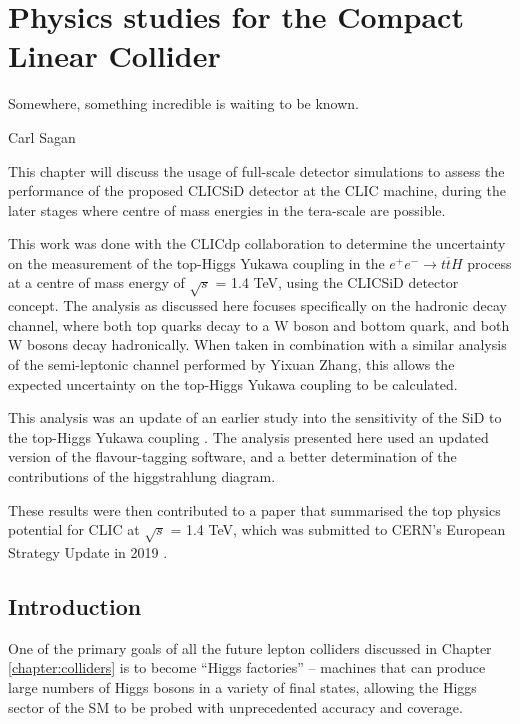 
\chapter{Physics studies for the Compact Linear Collider}
\label{chapter:analysis}

\epigraph{Somewhere, something incredible is waiting to be known.}{Carl Sagan}

This chapter will discuss the usage of full-scale detector simulations to assess the performance of the proposed \acrshort{CLIC}\textunderscore \acrshort{SiD} detector at the \acrlong{CLIC} machine, during the later stages where centre of mass energies in the tera-scale are possible.

This work was done with the \acrfull{CLICdp} collaboration to determine the uncertainty on the measurement of the top-Higgs Yukawa coupling in the $e^+ e^- \rightarrow t\overline{t}H$ process at a centre of mass energy of $\sqrt{s}$ = 1.4 TeV, using the \acrshort{CLIC}\textunderscore \acrshort{SiD} detector concept. The analysis as discussed here focuses specifically on the hadronic decay channel, where both top quarks decay to a W boson and bottom quark, and both W bosons decay hadronically. When taken in combination with a similar analysis of the semi-leptonic channel performed by Yixuan Zhang, this allows the expected uncertainty on the top-Higgs Yukawa coupling to be calculated.

This analysis was an update of an earlier study into the sensitivity of the \acrshort{SiD} to the top-Higgs Yukawa coupling \cite{clic-yukawa-coupling-2014}. The analysis presented here used an updated version of the flavour-tagging software, and a better determination of the contributions of the higgstrahlung diagram.

These results were then contributed to a paper that summarised the top physics potential for \acrshort{CLIC} at $\sqrt{s}$ = 1.4 TeV, which was submitted to \acrshort{CERN}'s European Strategy Update in 2019 \cite{clic-top-quark-physics} \cite{clic-2018-summary}.

\section{Introduction}
One of the primary goals of all the future lepton colliders discussed in Chapter \ref{chapter:colliders} is to become ``Higgs factories'' -- machines that can produce large numbers of Higgs bosons in a variety of final states, allowing the Higgs sector of the \acrlong{SM} to be probed with unprecedented accuracy and coverage.

